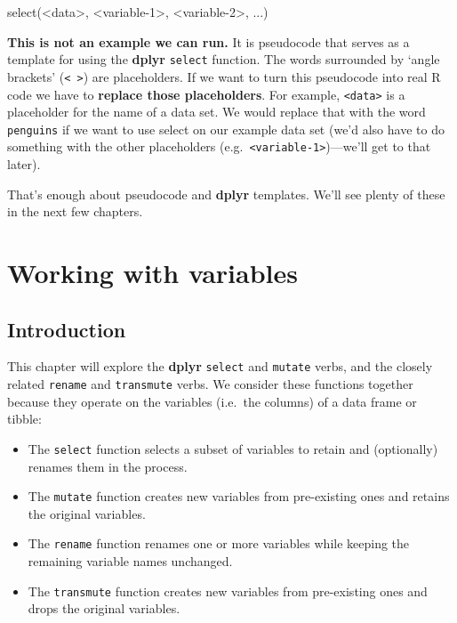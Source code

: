 \documentclass[
]{book}
\newenvironment{Shaded}{\begin{snugshade}}{\end{snugshade}}
\newcommand{\DecValTok}[1]{\textcolor[rgb]{0.00,0.00,0.81}{#1}}
\newcommand{\FunctionTok}[1]{\textcolor[rgb]{0.00,0.00,0.00}{#1}}
\newcommand{\NormalTok}[1]{#1}
\newcommand{\SpecialCharTok}[1]{\textcolor[rgb]{0.00,0.00,0.00}{#1}}
\providecommand{\tightlist}{%
  \setlength{\itemsep}{0pt}\setlength{\parskip}{0pt}}
\begin{document}
\begin{Shaded}
\begin{Highlighting}[]
\FunctionTok{select}\NormalTok{(}\SpecialCharTok{\textless{}}\NormalTok{data}\SpecialCharTok{\textgreater{}}\NormalTok{, }\SpecialCharTok{\textless{}}\NormalTok{variable}\DecValTok{{-}1}\SpecialCharTok{\textgreater{}}\NormalTok{, }\SpecialCharTok{\textless{}}\NormalTok{variable}\DecValTok{{-}2}\SpecialCharTok{\textgreater{}}\NormalTok{, ...)}
\end{Highlighting}
\end{Shaded}

\textbf{This is not an example we can run.} It is pseudocode that serves as a template for using the \textbf{dplyr} \texttt{select} function. The words surrounded by `angle brackets' (\texttt{\textless{}\ \textgreater{}}) are placeholders. If we want to turn this pseudocode into real R code we have to \textbf{replace those placeholders}. For example, \texttt{\textless{}data\textgreater{}} is a placeholder for the name of a data set. We would replace that with the word \texttt{penguins} if we want to use select on our example data set (we'd also have to do something with the other placeholders (e.g.~\texttt{\textless{}variable-1\textgreater{}})---we'll get to that later).

That's enough about pseudocode and \textbf{dplyr} templates. We'll see plenty of these in the next few chapters.

\hypertarget{working-with-variables}{%
\chapter{Working with variables}\label{working-with-variables}}

\hypertarget{introduction-3}{%
\section{Introduction}\label{introduction-3}}

This chapter will explore the \textbf{dplyr} \texttt{select} and \texttt{mutate} verbs, and the closely related \texttt{rename} and \texttt{transmute} verbs. We consider these functions together because they operate on the variables (i.e.~the columns) of a data frame or tibble:

\begin{itemize}
\tightlist
\item
  The \texttt{select} function selects a subset of variables to retain and (optionally) renames them in the process.
\item
  The \texttt{mutate} function creates new variables from pre-existing ones and retains the original variables.
\item
  The \texttt{rename} function renames one or more variables while keeping the remaining variable names unchanged.
\item
  The \texttt{transmute} function creates new variables from pre-existing ones and drops the original variables.
\end{itemize}
\end{document}
